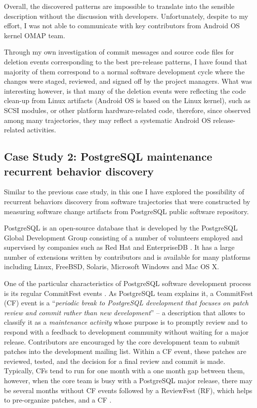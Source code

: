 Overall, the discovered patterns are impossible to translate into the sensible description without the discussion with developers. Unfortunately, despite to my effort, I was not able to communicate with key contributors from Android OS kernel OMAP team. 

Through my own investigation of commit messages and source code files for deletion events corresponding to the best pre-release patterns, I have found that majority of them correspond to a normal software development cycle where the changes were staged, reviewed, and signed off by the project managers. What was interesting however, is that many of the deletion events were reflecting the code clean-up from Linux artifacts (Android OS is based on the Linux kernel), such as SCSI modules, or other platform hardware-related code, therefore, since observed among many trajectories, they may reflect a systematic Android OS release-related activities.

\clearpage

\subsection{Case Study 2: PostgreSQL maintenance recurrent behavior discovery}\label{case2}
Similar to the previous case study, in this one I have explored the possibility of recurrent behaviors discovery from software trajectories that were constructed by measuring software change artifacts from PostgreSQL public software repository. 

PostgreSQL is an open-source database that is developed by the PostgreSQL Global Development Group consisting of a number of volunteers employed and supervised by companies such as Red Hat and EnterpriseDB \cite{postgre-contrib}. It has a large number of extensions written by contributors and is available for many platforms including Linux, FreeBSD, Solaris, Microsoft Windows and Mac OS X.

One of the particular characteristics of PostgreSQL software development process is its regular CommitFest events \cite{commit-fest}. As PostgreSQL team explains it, a CommitFest (CF) event is a ``\textit{periodic break to PostgreSQL development that focuses on patch review and commit rather than new development}'' -- a description that allows to classify it as a \textit{maintenance activity} whose purpose is to promptly review and to respond with a feedback to development community without waiting for a major release. Contributors are encouraged by the core development team to submit patches into the development mailing list. Within a CF event, these patches are reviewed, tested, and the decision for a final review and commit is made.  Typically, CFs tend to run for one month with a one month gap between them, however, when the core team is busy with a PostgreSQL major release, there may be several months without CF events followed by a ReviewFest (RF), which helps to pre-organize patches, and a CF . 

